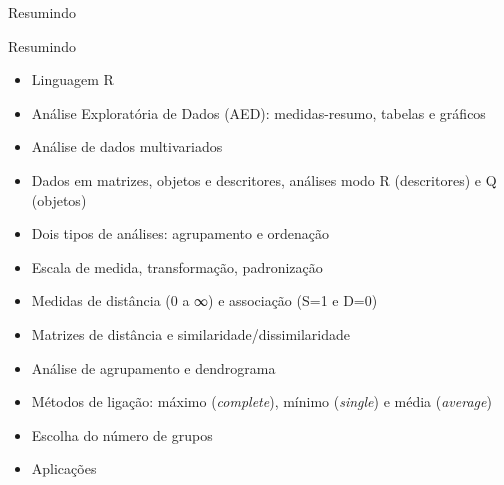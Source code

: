 \documentclass[
  ignorenonframetext,
]{beamer}
\begin{document}
\begin{frame}{Resumindo}
\protect\hypertarget{resumindo}{}
\begin{block}{Resumindo}
\protect\hypertarget{resumindo-1}{}
\begin{itemize}
\item
  Linguagem R
\item
  Análise Exploratória de Dados (AED): medidas-resumo, tabelas e
  gráficos
\item
  Análise de dados multivariados
\item
  Dados em matrizes, objetos e descritores, análises modo R
  (descritores) e Q (objetos)
\item
  Dois tipos de análises: agrupamento e ordenação
\item
  Escala de medida, transformação, padronização
\item
  Medidas de distância (0 a ∞) e associação (S=1 e D=0)
\item
  Matrizes de distância e similaridade/dissimilaridade
\item
  Análise de agrupamento e dendrograma
\item
  Métodos de ligação: máximo (\emph{complete}), mínimo (\emph{single}) e
  média (\emph{average})
\item
  Escolha do número de grupos
\item
  Aplicações
\end{itemize}
\end{block}
\end{frame}
\end{document}
